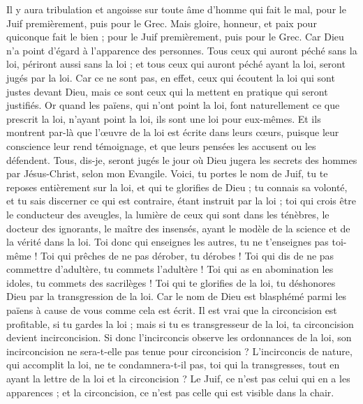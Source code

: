 \begin{multicols}{2}
Il y aura tribulation et angoisse sur toute âme d'homme qui fait le mal, pour le Juif premièrement, puis pour le Grec.
Mais gloire, honneur, et paix pour quiconque fait le bien ; pour le Juif premièrement, puis pour le Grec.
Car Dieu n'a point d'égard à l'apparence des personnes.
Tous ceux qui auront péché sans la loi, périront aussi sans la loi ; et tous ceux qui auront péché ayant la loi, seront jugés par la loi.
Car ce ne sont pas, en effet, ceux qui écoutent la loi qui sont justes devant Dieu, mais ce sont ceux qui la mettent en pratique qui seront justifiés.
Or quand les païens, qui n'ont point la loi, font naturellement ce que prescrit la loi, n'ayant point la loi, ils sont une loi pour eux-mêmes.
Et ils montrent par-là que l’œuvre de la loi est écrite dans leurs cœurs, puisque leur conscience leur rend témoignage, et que leurs pensées les accusent ou les défendent.
Tous, dis-je, seront jugés le jour où Dieu jugera les secrets des hommes par Jésus-Christ, selon mon Evangile.
Voici, tu portes le nom de Juif, tu te reposes entièrement sur la loi, et qui te glorifies de Dieu ;
tu connais sa volonté, et tu sais discerner ce qui est contraire, étant instruit par la loi ; toi qui crois être le conducteur des aveugles, la lumière de ceux qui sont dans les ténèbres,
le docteur des ignorants, le maître des insensés, ayant le modèle de la science et de la vérité dans la loi.
Toi donc qui enseignes les autres, tu ne t’enseignes pas toi-même ! Toi qui prêches de ne pas dérober, tu dérobes !
Toi qui dis de ne pas commettre d’adultère, tu commets l’adultère ! Toi qui as en abomination les idoles, tu commets des sacrilèges !
Toi qui te glorifies de la loi, tu déshonores Dieu par la transgression de la loi.
Car le nom de Dieu est blasphémé parmi les païens à cause de vous comme cela est écrit.
Il est vrai que la circoncision est profitable, si tu gardes la loi ; mais si tu es transgresseur de la loi, ta circoncision devient incirconcision.
Si donc l’incirconcis observe les ordonnances de la loi, son incirconcision ne sera-t-elle pas tenue pour circoncision ?
L’incirconcis de nature, qui accomplit la loi, ne te condamnera-t-il pas, toi qui la transgresses, tout en ayant la lettre de la loi et la circoncision ?
Le Juif, ce n’est pas celui qui en a les apparences ; et la circoncision, ce n’est pas celle qui est visible dans la chair.

\end{multicols}
